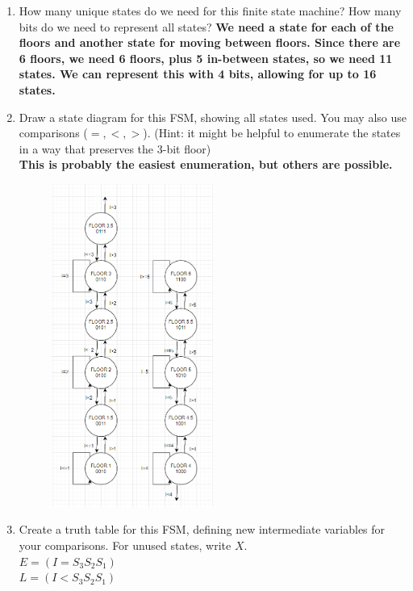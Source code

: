 \documentclass{article}
\begin{document}
\begin{enumerate}[label=\alph*.]
\item How many unique states do we need for this finite state machine? How many bits do we need to represent all states?
\textbf{We need a state for each of the floors and another state for moving between floors. Since there are 6 floors, we need 6 floors, plus 5 in-between states, so we need 11 states. We can represent this with 4 bits, allowing for up to 16 states.}
\newpage
\item Draw a state diagram for this FSM, showing all states used. You may also use comparisons ($=, <, >$). (Hint: it might be helpful to enumerate the states in a way that preserves the 3-bit floor) \\
\textbf{This is probably the easiest enumeration, but others are possible.}
\begin{figure}[!h]
    \centering
    \includegraphics[width=0.5\textwidth]{figures/fsm2b-solution.png}
\end{figure}
\newpage
\item Create a truth table for this FSM, defining new intermediate variables for your comparisons. For unused states, write $X$.\\
$E = (I = S_3S_2S_1)$ \\
$L = (I < S_3S_2S_1)$ \\

\end{enumerate}
\end{document}
